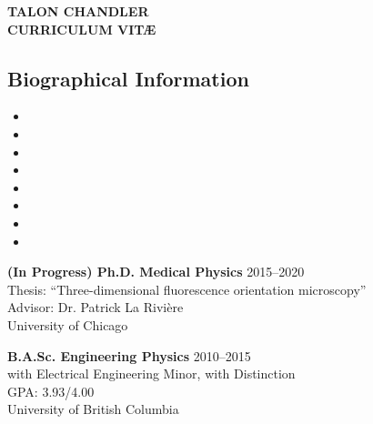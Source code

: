 \documentclass[12pt,letterpaper]{article}
\begin{document}
\begin{center}
{\Large \textbf{TALON CHANDLER}}\\
{\textbf{CURRICULUM VIT\AE}}\\
\end{center}
\vspace{-1em}

\subsection*{Biographical Information}
\begin{itemize}[noitemsep]
\item[]  
\item[]  
\item[]  
\item[] \itab{} 
\item[] \itab{} 
\item[]  
\item[]  
\item[]  
\end{itemize}

\begin{etaremune}[labelsep=0.035\textwidth]
\item
  \textbf{(In Progress) Ph.D. Medical Physics} \hfill 2015--2020\\
  Thesis: ``Three-dimensional fluorescence orientation microscopy''\\
  Advisor: Dr. Patrick La Rivi\`ere \\
  University of Chicago
\item
  \textbf{B.A.Sc. Engineering Physics} \hfill 2010--2015\\
  with Electrical Engineering Minor, with Distinction\\
  GPA: 3.93/4.00\\
  University of British Columbia
\end{etaremune}

\nocite{*}
\setlength{}
\printbibliography[heading=none, type=article, sorting=ynt]
\end{document}
